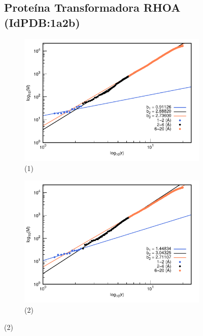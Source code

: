 \color{black}
	\begin{figure}[H]
	\subsection*{Proteína Transformadora RHOA (IdPDB:1a2b)}	
	\hspace{-0.3cm} 
	\begin{subfigure}{0.49\textwidth}
		\centering
		\includegraphics[width=\linewidth,page=1]{graphs/PDBs/1a2b/1a2baddH.pdf}
		\caption{(1)}
	\end{subfigure}
	\hspace{0.2cm}
	\begin{subfigure}{0.49\textwidth}
		\centering
		\includegraphics[width=\linewidth,page=1]{graphs/PDBs/1a2b/1a2bEm.pdf}
		\caption{(2)}
	\end{subfigure}
	

\end{figure}
